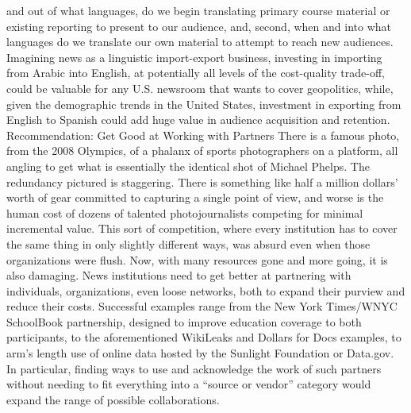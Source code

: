 and out of what languages, do we begin translating primary course material or
existing reporting to present to our audience, and, second, when and into what
languages do we translate our own material to attempt to reach new audiences.
Imagining news as a linguistic import-export business, investing in importing
from Arabic into English, at potentially all levels of the cost-quality trade-off,
could be valuable for any U.S. newsroom that wants to cover geopolitics, while,
given the demographic trends in the United States, investment in exporting from
English to Spanish could add huge value in audience acquisition and retention.
Recommendation: Get Good at Working with Partners
There is a famous photo, from the 2008 Olympics, of a phalanx of
sports photographers on a platform, all angling to get what is essentially
the identical shot of Michael Phelps. The redundancy pictured is
staggering. There is something like half a million dollars’ worth of gear
committed to capturing a single point of view, and worse is the human
cost of dozens of talented photojournalists competing for minimal
incremental value.
This sort of competition, where every institution has to cover the same
thing in only slightly different ways, was absurd even when those organizations
were flush. Now, with many resources gone and more going,
it is also damaging.
News institutions need to get better at partnering with individuals, organizations,
even loose networks, both to expand their purview and reduce their costs. Successful
examples range from the New York Times/WNYC SchoolBook partnership,
designed to improve education coverage to both participants, to the
aforementioned WikiLeaks and Dollars for Docs examples, to arm’s length use of
online data hosted by the Sunlight Foundation or Data.gov. In particular, finding
ways to use and acknowledge the work of such partners without needing
to fit everything into a ``source or vendor'' category would expand the range of
possible collaborations.


